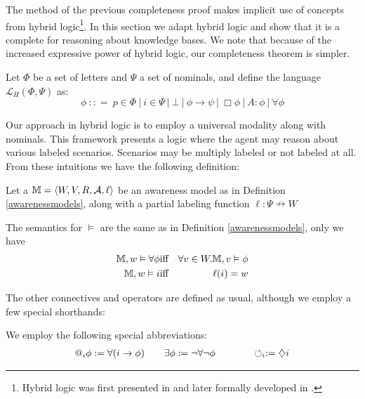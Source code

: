The method of the previous completeness proof makes implicit use of concepts from
hybrid logic{\footnote{Hybrid logic was first presented in
{\cite{prior_revised_1969}} and later formally developed in
{\cite{bull_approach_1970}}.}}.  In this section we adapt hybrid logic and
show that it is a complete for reasoning about knowledge bases.  We note that
because of the increased expressive power of hybrid logic, our completeness
theorem is simpler.

\begin{definition}
  Let $\Phi$ be a set of letters and $\Psi$ a set of nominals, and define the
  language $\mathcal{L}_H (\Phi, \Psi)$ as:
  \[ \phi \  : : = \  p \in \Phi \  |
     \  i \in \Psi \  | \  \bot \  |
     \  \phi \rightarrow \psi \  | \  \Box \phi
     \  | \  A : \phi \  | \  \forall
     \phi \]
\end{definition}

Our approach in hybrid logic is to employ a universal modality along with
nominals.  This framework presents a logic where the agent may reason about
various labeled scenarios.  Scenarios may be multiply labeled or not labeled
at all.  From these intuitions we have the following definition:

\begin{definition}
  \label{hybridsemantics}Let a  $\mathbbm{M}= \langle
  W, V, R, \mathcal{A}, \ell \rangle$ be an awareness model as in Definition
  \ref{awarenessmodels}, along with a partial labeling function $\ell : \Psi
  \nrightarrow W$
  
  
  
  The semantics for $\vDash$ are the same as in Definition
  \ref{awarenessmodels}, only we have
  \begin{eqnarray*}
    \mathbbm{M}, w \vDash \forall \phi & \text{iff} & \forall v \in
    W.\mathbbm{M}, v \vDash \phi\\
    \mathbbm{M}, w \vDash i & \text{iff} & \ell (i) = w
  \end{eqnarray*}
\end{definition}

The other connectives and operators are defined as usual, although we employ a
few special shorthands:

\begin{definition}
  We employ the following special abbreviations:
  \begin{eqnarray}
    \text{\tmtextup{@}}_i \phi \assign \forall (i \rightarrow \phi)
    \hspace{2em} & \exists \phi \assign \neg \forall \neg \phi \hspace{3em} &
    \circlearrowleft_i \assign \diamondsuit i \nonumber
  \end{eqnarray}
\end{definition}

